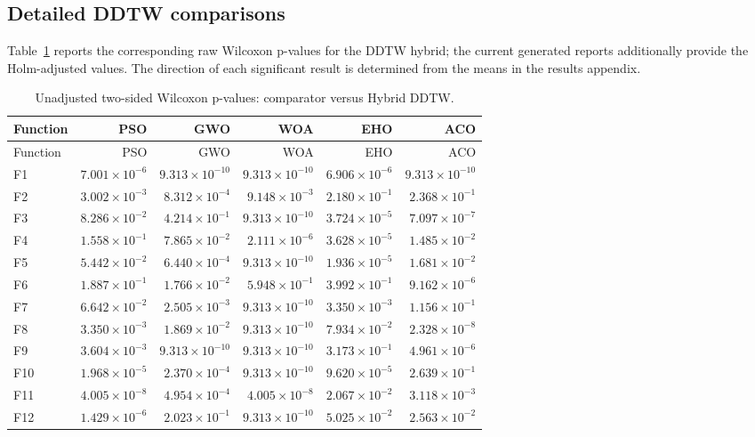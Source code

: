 \subsection{Detailed DDTW comparisons}

Table~\ref{tab:cec2022-ddtw-wilcoxon} reports the corresponding raw Wilcoxon
p-values for the DDTW hybrid; the current generated reports additionally
provide the Holm-adjusted values. The direction of each significant result
is determined from the means in the results appendix.

\scriptsize
\begin{longtable}{lrrrrr}
\caption{Unadjusted two-sided Wilcoxon p-values: comparator versus Hybrid DDTW.}\label{tab:cec2022-ddtw-wilcoxon}\\
\toprule
Function & PSO & GWO & WOA & EHO & ACO\\
\midrule
\endfirsthead
\toprule
Function & PSO & GWO & WOA & EHO & ACO\\
\midrule
\endhead
F1  & $7.001\times10^{-6}$  & $9.313\times10^{-10}$ & $9.313\times10^{-10}$ & $6.906\times10^{-6}$  & $9.313\times10^{-10}$\\
F2  & $3.002\times10^{-3}$  & $8.312\times10^{-4}$  & $9.148\times10^{-3}$  & $2.180\times10^{-1}$  & $2.368\times10^{-1}$\\
F3  & $8.286\times10^{-2}$  & $4.214\times10^{-1}$  & $9.313\times10^{-10}$ & $3.724\times10^{-5}$  & $7.097\times10^{-7}$\\
F4  & $1.558\times10^{-1}$  & $7.865\times10^{-2}$  & $2.111\times10^{-6}$  & $3.628\times10^{-5}$  & $1.485\times10^{-2}$\\
F5  & $5.442\times10^{-2}$  & $6.440\times10^{-4}$  & $9.313\times10^{-10}$ & $1.936\times10^{-5}$  & $1.681\times10^{-2}$\\
F6  & $1.887\times10^{-1}$  & $1.766\times10^{-2}$  & $5.948\times10^{-1}$  & $3.992\times10^{-1}$  & $9.162\times10^{-6}$\\
F7  & $6.642\times10^{-2}$  & $2.505\times10^{-3}$  & $9.313\times10^{-10}$ & $3.350\times10^{-3}$  & $1.156\times10^{-1}$\\
F8  & $3.350\times10^{-3}$  & $1.869\times10^{-2}$  & $9.313\times10^{-10}$ & $7.934\times10^{-2}$  & $2.328\times10^{-8}$\\
F9  & $3.604\times10^{-3}$  & $9.313\times10^{-10}$  & $9.313\times10^{-10}$ & $3.173\times10^{-1}$  & $4.961\times10^{-6}$\\
F10 & $1.968\times10^{-5}$  & $2.370\times10^{-4}$  & $9.313\times10^{-10}$ & $9.620\times10^{-5}$  & $2.639\times10^{-1}$\\
F11 & $4.005\times10^{-8}$  & $4.954\times10^{-4}$  & $4.005\times10^{-8}$  & $2.067\times10^{-2}$  & $3.118\times10^{-3}$\\
F12 & $1.429\times10^{-6}$  & $2.023\times10^{-1}$  & $9.313\times10^{-10}$  & $5.025\times10^{-2}$  & $2.563\times10^{-2}$\\
\bottomrule
\end{longtable}
\normalsize

